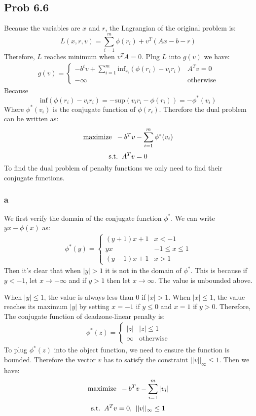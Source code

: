 \message{ !name(ass4_ChangLi.tex)}\documentclass[10pt,a4paper]{article}
\begin{document}
\subsection{Prob 6.6}
Because the variables are $x$ and $r$, the Lagrangian of the
original problem is:
$$
L(x,r,v) = \sum_{i=1}^{m}\phi(r_i)+v^T(Ax-b-r)
$$
Therefore, $L$ reaches minimum when $v^TA=0$. Plug $L$ into
$g(v)$ we have: 
\begin{align*}
  g(v)=
  \begin{cases}
    -b^tv+\sum_{i=1}^{m}\text{inf}_{r_i}(\phi(r_i)-v_ir_i) & A^Tv=0 \\
    -\infty & \text{otherwise}
  \end{cases}
\end{align*}
Because 
$$\text{inf}(\phi(r_i) - v_ir_i) = - \text{sup}(v_ir_i - \phi(r_i)) = -\phi^*(v_i)$$
Where $\phi^*(v_i)$ is the conjugate function of
$\phi(r_i)$. Therefore the dual problem can be written as:
$$\text{maximize\;\;} -b^Tv-\sum_{i=1}^{m}\phi^*(v_i)$$
$$\text{s.t.\;\;} A^Tv=0$$
To find the dual problem of penalty functions we only need
to find their conjugate functions.

\subsubsection{a}
We first verify the domain of the conjugate function $\phi^*$. We can
write $yx-\phi(x)$ as:
\begin{align*}
  \phi^*(y)=
  \begin{cases}
    (y+1)x+1 & x<-1\\
    yx & -1\leq x\leq 1\\
    (y-1)x+1 & x>1
  \end{cases}
\end{align*}
Then it's clear that when $|y|>1$ it is not in the domain of
$\phi^*$. This is because if $y<-1$, let $x\rightarrow
-\infty$ and if $y>1$ then let $x \rightarrow \infty$. The
value is unbounded above.

When $|y|\leq 1$, the value is always less than $0$ if
$|x|>1$. When $|x|\leq 1$, the value reaches its maximum
$|y|$ by setting $x=-1$ if $y\leq 0$ and $x=1$ if $y>0$.
Therefore, The conjugate function of deadzone-linear penalty
is:
\begin{align*}
  \phi^*(z) = 
  \begin{cases}
    |z| & |z|\leq 1\\
    \infty & \text{otherwise}
  \end{cases}
\end{align*}
To plug $\phi^*(z)$ into the object function, we need to
ensure the function is bounded. Therefore the vector $v$
has to satisfy the constraint $||v||_{\infty}\leq 1$. Then
we have:
$$\text{maximize\;\;} -b^Tv-\sum_{i=1}^{m}|v_i|$$
$$\text{s.t.\;\;} A^Tv=0\text{,\;\;} ||v||_{\infty}\leq 1$$
\end{document}
